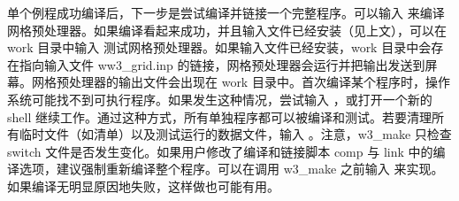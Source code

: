 单个例程成功编译后，下一步是尝试编译并链接一个完整程序。可以输入  来编译网格预处理器。如果编译看起来成功，并且输入文件已经安装（见上文），可以在 work 目录中输入  测试网格预处理器。如果输入文件已经安装，work 目录中会存在指向输入文件 {\file ww3\_grid.inp} 的链接，网格预处理器会运行并把输出发送到屏幕。网格预处理器的输出文件会出现在 work 目录中。首次编译某个程序时，操作系统可能找不到可执行程序。如果发生这种情况，尝试输入 ，或打开一个新的 shell 继续工作。通过这种方式，所有单独程序都可以被编译和测试。若要清理所有临时文件（如清单）以及测试运行的数据文件，输入 。注意，{\file w3\_make} 只检查 switch 文件是否发生变化。如果用户修改了编译和链接脚本 {\file comp} 与 {\file link} 中的编译选项，建议强制重新编译整个程序。可以在调用 {\file w3\_make} 之前输入  来实现。如果编译无明显原因地失败，这样做也可能有用。

